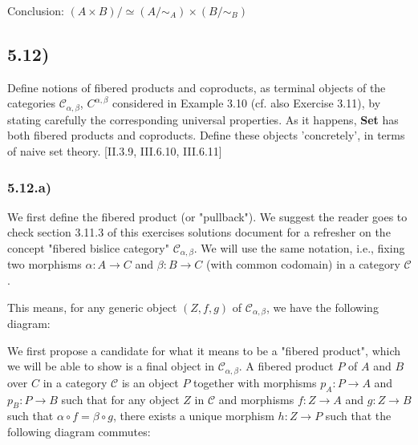 \documentclass[12pt, letterpaper, twoside]{report}
\begin{document}
Conclusion: $(A \times B)/ \simeq (A / \sim_A) \times (B / \sim_B)$



\subsection*{5.12)}

Define notions of fibered products and coproducts, as terminal objects of the categories $\mathcal{C}_{\alpha,\beta}$, $C^{\alpha,\beta}$ considered in Example 3.10 (cf. also Exercise 3.11), by stating carefully the corresponding universal properties.
As it happens, \textbf{Set} has both fibered products and coproducts. Define these objects 'concretely', in terms of naive set theory. [II.3.9, III.6.10, III.6.11]


\subsubsection*{5.12.a)}

We first define the fibered product (or "pullback"). We suggest the reader goes to check section 3.11.3 of this exercises solutions document for a refresher on the concept "fibered bislice category" $\mathcal{C}_{\alpha,\beta}$. We will use the same notation, i.e., fixing two morphisms $\alpha : A \to C$ and $\beta : B \to C$ (with common codomain) in a category $\mathcal{C}$.

This means, for any generic object $(Z, f, g)$ of $\mathcal{C}_{\alpha,\beta}$, we have the following diagram:


We first propose a candidate for what it means to be a "fibered product", which we will be able to show is a final object in $\mathcal{C}_{\alpha,\beta}$. A fibered product $P$ of $A$ and $B$ over $C$ in a category $\mathcal{C}$ is an object $P$ together with morphisms $p_A : P \to A$ and $p_B : P \to B$ such that for any object $Z$ in $\mathcal{C}$ and morphisms $f : Z \to A$ and $g : Z \to B$ such that $\alpha \circ f = \beta \circ g$, there exists a unique morphism $h : Z \to P$ such that the following diagram commutes:
\end{document}
